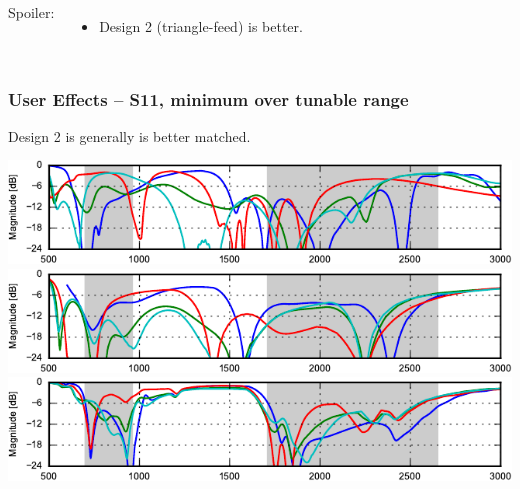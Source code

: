 \begin{frame}
\begin{columns}[onlytextwidth,T]
        Spoiler:
        \begin{itemize}
            \item Design 2 (triangle-feed) is better.
        \end{itemize}
    \end{columns}
\end{frame}

\begin{frame}
    \frametitle{User Effects -- S11, minimum over tunable range}
    Design 2 is generally is better matched.
    \begin{center}
        \includegraphics{img/soren/ue/design1lt/s11top.pdf}\\
        \includegraphics{img/soren/ue/design2sn/s11top.pdf}\\
        \includegraphics{img/soren/ue/design3hv/s11top.pdf}
    \end{center}
    \legendfooter
\end{frame}

